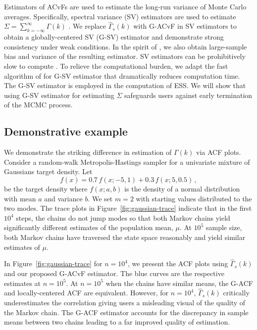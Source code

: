 \documentclass[12pt]{article}
\theoremstyle{remark}
\newtheorem{example}{Example}
\begin{document}
Estimators of ACvFs are used to estimate the long-run variance of Monte Carlo averages. Specifically, spectral variance (SV) estimators  are used to estimate $\Sigma = \sum_{k=-\infty}^{\infty} \Gamma(k)$ \citep{andr:1991,dame:1991,fleg:jone:2010}. We replace $\hat{\Gamma}_s(k)$ with G-ACvF in SV estimators to obtain a globally-centered SV (G-SV) estimator and demonstrate strong consistency under weak conditions. In the spirit of \cite{andr:1991}, we also obtain large-sample bias and variance of the resulting estimator. SV estimators can be prohibitively slow to  compute \citep{liu:fleg:2018}. To relieve the computational burden, we adapt the fast algorithm of \cite{heberle2017fast} for G-SV estimator that dramatically reduces computation time. The G-SV estimator  is employed in the computation of ESS. We will show that using G-SV estimator for estimating $\Sigma$ safeguards users against early termination of the MCMC process.

\subsection{Demonstrative example} %
\label{sub:demonstrative_example}


We demonstrate the striking difference in estimation of $\Gamma(k)$ via ACF plots. Consider a random-walk Metropolis-Hastings sampler for a univariate mixture of Gaussians target density. Let
\[
f(x) = 0.7\,f(x; -5, 1) + 0.3\,f(x; 5, 0.5)\,,
\]
be the target density where $f(x; a,b)$ is the density of a normal distribution with mean $a$ and variance $b$. 
We set $m = 2$ with starting values distributed to the two modes. The trace plots in Figure~\ref{fig:gaussian-trace} indicate that in the first $10^4$ steps, the chains do not jump modes so that both Markov chains yield significantly different estimates of the population mean, $\mu$. At $10^5$ sample size, both Markov chains have traversed the state space reasonably and yield similar estimates of $\mu$. 

In Figure~\ref{fig:gaussian-trace} for $n = 10^4$, we present the ACF plots using $\hat{\Gamma}_s(k)$ and our proposed G-ACvF estimator. The blue curves are the respective estimates at $n = 10^5$. At $n = 10^5$ when the chains have similar means, the G-ACF and locally-centered ACF are equivalent.  However, for $n = 10^4$, $\hat{\Gamma}_s(k)$ critically underestimates the correlation giving users a misleading visual of the quality of the Markov chain. 
The G-ACF estimator accounts for the discrepancy in sample means between two chains leading to a far improved quality of estimation.
\end{document}
